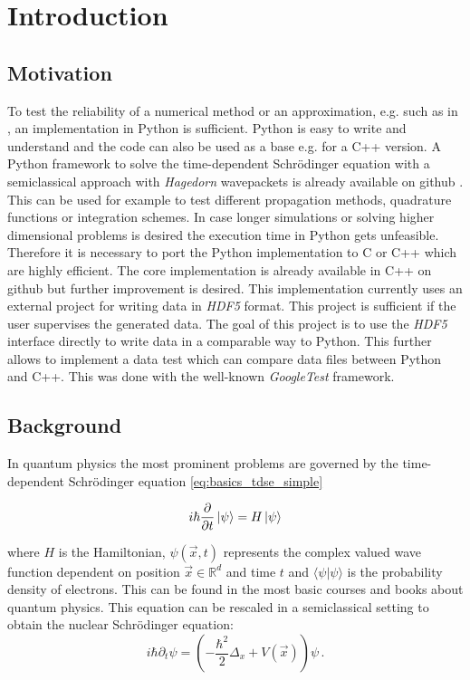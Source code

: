\chapter{Introduction}

\section{Motivation}
To test the reliability of a numerical method or an approximation, e.g. such as in \cite{B_bachelor_thesis}, an implementation in Python is sufficient. Python is easy to write and understand and the code can also be used as a base e.g. for a C++ version. A Python framework to solve the time-dependent Schr\"odinger equation with a semiclassical approach with \textit{Hagedorn} wavepackets is already available on github \cite{waveblocksnd}. This can be used for example to test different propagation methods, quadrature functions or integration schemes. In case longer simulations or solving higher dimensional problems is desired the execution time in Python gets unfeasible. Therefore it is necessary to port the Python implementation to C or C++ which are highly efficient. The core implementation is already available in C++ on github \cite{libwaveblocks} but further improvement is desired. This implementation currently uses an external project \cite{eigen3-hdf5} for writing data in \textit{HDF5} format. This project is sufficient if the user supervises the generated data. The goal of this project is to use the \textit{HDF5} interface \cite{hdf5cppdoc} directly to write data in a comparable way to Python. This further allows to implement a data test which can compare data files between Python and C++. This was done with the well-known \textit{GoogleTest} \cite{googletest} framework.

\section{Background}
\label{seq:background}

In quantum physics the most prominent problems are governed by the time-dependent
Schr\"odinger equation \ref{eq:basics_tdse_simple}

\begin{equation} \label{eq:basics_tdse_simple}
  i \hbar \frac{\partial}{\partial t} \Ket{\psi} = H \Ket{\psi}
\end{equation}

where $H$ is the Hamiltonian, $\psi(\vec{x},t)$ represents the complex valued wave function dependent on position $\vec{x} \in \mathbb{R}^{d}$ and
time $t$ and $\langle \psi | \psi  \rangle$ is the probability density of electrons. This can be found in the most basic courses and books about quantum physics. This equation can be rescaled in a semiclassical setting to obtain the nuclear Schr\"odinger equation: \
\begin{equation}
\label{eq:tdse_sc_nuclei}
 i\hbar \partial_{t}\psi = \left( -\frac{\hbar^{2}}{2} \Delta_{x} + V(\vec{x}) \right) \psi\,.
\end{equation}

